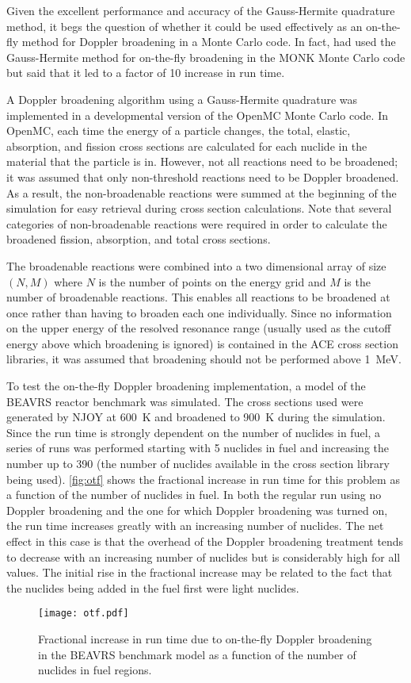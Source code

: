 \documentclass[3p,authoryear]{elsarticle}
\begin{document}
Given the excellent performance and accuracy of the Gauss-Hermite quadrature
method, it begs the question of whether it could be used effectively as an
on-the-fly method for Doppler broadening in a Monte Carlo code. In fact,
\citet{nd-dean-2010} had used the Gauss-Hermite method for on-the-fly broadening
in the MONK Monte Carlo code but said that it led to a factor of 10 increase in
run time.

A Doppler broadening algorithm using a Gauss-Hermite quadrature was implemented
in a developmental version of the OpenMC Monte Carlo code. In OpenMC, each time
the energy of a particle changes, the total, elastic, absorption, and fission
cross sections are calculated for each nuclide in the material that the particle
is in. However, not all reactions need to be broadened; it was assumed that only
non-threshold reactions need to be Doppler broadened. As a result, the
non-broadenable reactions were summed at the beginning of the simulation for
easy retrieval during cross section calculations. Note that several categories
of non-broadenable reactions were required in order to calculate the broadened
fission, absorption, and total cross sections.

The broadenable reactions were combined into a two dimensional array of size
$(N,M)$ where $N$ is the number of points on the energy grid and $M$ is the
number of broadenable reactions. This enables all reactions to be broadened at
once rather than having to broaden each one individually. Since no information
on the upper energy of the resolved resonance range (usually used as the cutoff
energy above which broadening is ignored) is contained in the ACE cross section
libraries, it was assumed that broadening should not be performed above
\SI{1}{\mega\electronvolt}.

To test the on-the-fly Doppler broadening implementation, a model of the BEAVRS
reactor benchmark was simulated. The cross sections used were generated by NJOY
at \SI{600}{\kelvin} and broadened to \SI{900}{\kelvin} during the
simulation. Since the run time is strongly dependent on the number of nuclides
in fuel, a series of runs was performed starting with 5 nuclides in fuel and
increasing the number up to 390 (the number of nuclides available in the cross
section library being used). \autoref{fig:otf} shows the fractional increase in
run time for this problem as a function of the number of nuclides in fuel. In
both the regular run using no Doppler broadening and the one for which Doppler
broadening was turned on, the run time increases greatly with an increasing
number of nuclides. The net effect in this case is that the overhead of the
Doppler broadening treatment tends to decrease with an increasing number of
nuclides but is considerably high for all values. The initial rise in the
fractional increase may be related to the fact that the nuclides being added in
the fuel first were light nuclides.
\begin{figure}[H]
  \centering
  \texttt{[image: otf.pdf]}
  \caption{Fractional increase in run time due to on-the-fly Doppler broadening
    in the BEAVRS benchmark model as a function of the number of nuclides in
    fuel regions.}
  \label{fig:otf}
\end{figure}
\end{document}
